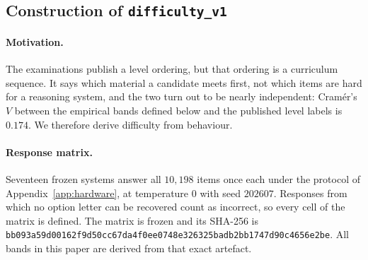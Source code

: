 
\subsection{Construction of \texttt{difficulty\_v1}}
\label{app:difficulty}

\paragraph{Motivation.}
The examinations publish a level ordering, but that ordering is a curriculum sequence. It says
which material a candidate meets first, not which items are hard for a reasoning system, and the
two turn out to be nearly independent: Cram\'er's $V$ between the empirical bands defined below
and the published level labels is $0.174$. We therefore derive difficulty from behaviour.

\paragraph{Response matrix.}
Seventeen frozen systems answer all $10{,}198$ items once each under the protocol of
Appendix~\ref{app:hardware}, at temperature $0$ with seed $202607$. Responses from which no
option letter can be recovered count as incorrect, so every cell of the matrix is defined. The
matrix is frozen and its SHA-256 is
\texttt{bb093a59d00162f9d50cc67da4f0ee0748e326325badb2bb1747d90c4656e2be}. All bands in this
paper are derived from that exact artefact.


